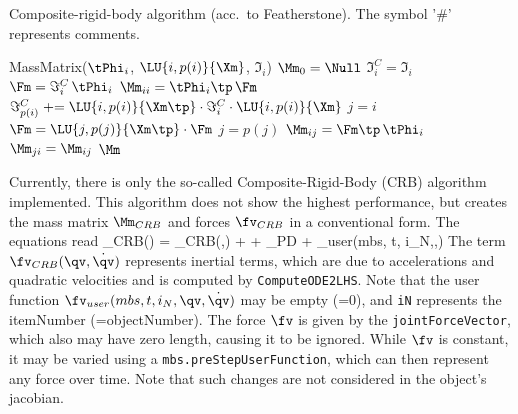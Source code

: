{    \begin{algorithm}
    \caption{Composite-rigid-body algorithm (acc.\ to Featherstone). The symbol '\#' represents comments.}
    \begin{algorithmic}[1]
    \REQUIRE MassMatrix($\tPhi_i$, $\LU{i,p(i)}{\Xm}$, $\Im_i$)
    \STATE {}
    \STATE $\Mm_0 = \Null$
        \STATE {}
        \STATE $\Im_i^C = \Im_i$ 
    \ENDFOR
    \STATE {}
        \STATE {}
        \STATE $\Fm = \Im_i^C \, \tPhi_i$ 
        \STATE $\Mm_{ii} = \tPhi_i\tp \, \Fm$ 
            \STATE $\Im_{p(i)}^C \mathrel{+}= \LU{i,p(i)}{\Xm\tp} \cdot \Im_i^C \cdot \LU{i,p(i)}{\Xm}$
        \ENDIF
        \STATE $j = i$
        \STATE {}
            \STATE $\Fm = \LU{j,p(j)}{\Xm\tp} \cdot \Fm$
            \STATE $j = p(j)$
            \STATE $\Mm_{ij} = \Fm\tp \, \tPhi_i $
            \STATE $\Mm_{ji} = \Mm_{ij}$
        \ENDWHILE
    \ENDFOR
    \RETURN $\Mm$
    \ENSURE 
    \end{algorithmic}
    \end{algorithm}
    } %

    Currently, there is only the so-called Composite-Rigid-Body (CRB) algorithm implemented.
    This algorithm does not show the highest performance, but creates the mass matrix $\Mm_{CRB}$ and forces $\fv_{CRB}$
    in a conventional form. The equations read
    \be \label{eq_KinematicTree_EOM}
      \Mm_{CRB}(\qv) \ddot \qv = \fv_{CRB}(\qv,\dot \qv) + \fv + \fv_{PD} + \fv_{user}(mbs, t, i_N,\qv,\dot \qv)
    \ee
    The term $\fv_{CRB}(\qv,\dot \qv)$ represents inertial terms, which are due to accelerations and 
    quadratic velocities and is computed by \texttt{ComputeODE2LHS}.
    Note that the user function $\fv_{user}(mbs, t, i_N,\qv,\dot \qv)$ may be empty (=0), 
    and \texttt{iN} represents the itemNumber (=objectNumber). 
    The force $\fv$ is given by the \texttt{jointForceVector}, which also may have zero length, causing it to be ignored.
    While $\fv$ is constant, it may be varied using a \texttt{mbs.preStepUserFunction}, which can
    then represent any force over time. Note that such changes are not considered in the object's jacobian.
    
